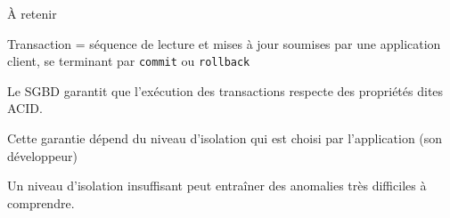 \begin{frame}{À retenir}

Transaction = séquence de lecture et mises à jour soumises par une application client, se terminant
par \texttt{commit} ou \texttt{rollback}

\vfill

Le SGBD \alert{garantit} que l'exécution des transactions respecte des propriétés dites ACID. 

\vfill

Cette garantie dépend du \alert{niveau d'isolation} qui est choisi par l'application (son développeur)

\vfill
\begin{blocgauche}
\alert{Un niveau d'isolation insuffisant peut entraîner des anomalies très difficiles à comprendre.}
\end{blocgauche}

\end{frame}

